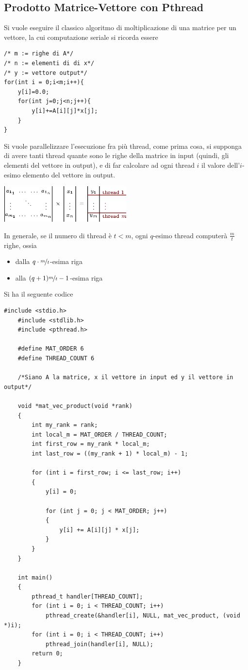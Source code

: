 \documentclass[10pt, letterpaper]{report}
\begin{document}
\subsection{Prodotto Matrice-Vettore con Pthread}
Si vuole eseguire il classico algoritmo di moltiplicazione di una matrice per un vettore, la cui 
computazione seriale si ricorda essere
\begin{lstlisting}[style=CStyle]
/* m := righe di A*/
/* n := elementi di di x*/
/* y := vettore output*/
for(int i = 0;i<m;i++){
    y[i]=0.0;
    for(int j=0;j<n;j++){
        y[i]+=A[i][j]*x[j];
    }
}
\end{lstlisting}
Si vuole parallelizzare l'esecuzione fra più thread, come prima cosa, si supponga di avere tanti thread 
quante sono le righe della matrice in input (quindi, gli elementi del vettore in output), e di far calcolare 
ad ogni thread $i$ il valore dell'$i$-esimo elemento del vettore in output.\begin{center}
    \includegraphics[width=0.5\textwidth]{images/threadMatProd.eps}
\end{center} 
In generale, se il numero di thread è $t<m$, ogni $q$-esimo thread computerà $\frac{m}{t}$ righe, ossia  \begin{itemize}
    \item dalla \color{teal}$q\cdot\nicefrac{m}{t}$\color{black}-esima riga 
    \item alla \color{teal}$(q+1)\nicefrac{m}{t}-1$\color{black}-esima riga
\end{itemize}
Si ha il seguente codice
\begin{lstlisting}[style=CStyle]
    #include <stdio.h>
    #include <stdlib.h>
    #include <pthread.h>
    
    #define MAT_ORDER 6
    #define THREAD_COUNT 6
    
    /*Siano A la matrice, x il vettore in input ed y il vettore in output*/
    
    void *mat_vec_product(void *rank)
    {
        int my_rank = rank;
        int local_m = MAT_ORDER / THREAD_COUNT;
        int first_row = my_rank * local_m;
        int last_row = ((my_rank + 1) * local_m) - 1;
    
        for (int i = first_row; i <= last_row; i++)
        {
            y[i] = 0;
    
            for (int j = 0; j < MAT_ORDER; j++)
            {
                y[i] += A[i][j] * x[j];
            }
        }
    }
    
    int main()
    {
        pthread_t handler[THREAD_COUNT];
        for (int i = 0; i < THREAD_COUNT; i++)
            pthread_create(&handler[i], NULL, mat_vec_product, (void *)i);
        for (int i = 0; i < THREAD_COUNT; i++)
            pthread_join(handler[i], NULL);
        return 0;
    }
\end{lstlisting}\flowerLine 
\end{document}
